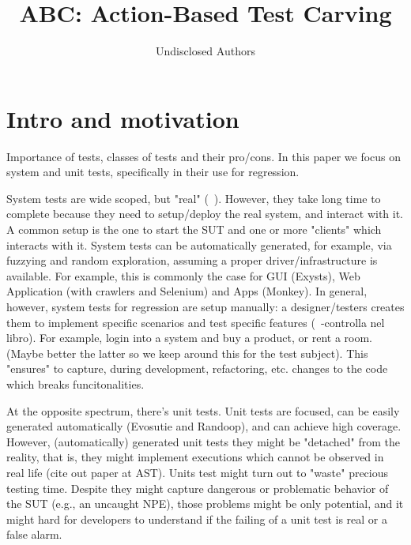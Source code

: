 \documentclass[10pt,conference]{IEEEtran}
\title{ABC: Action-Based Test Carving}
\author{Undisclosed Authors}
\author{\IEEEauthorblockN{Alessio Gambi}
\IEEEauthorblockA{\textit{University of Passau} \\
Passau, Germany \\
alessio.gambi@uni-passau.de}%
}
\begin{document}
\maketitle

\begin{abstract}
\end{abstract}

\section{Intro and motivation}
Importance of tests, classes of tests and their pro/cons.
In this paper we focus on system and unit tests, specifically in their use for regression.

System tests are wide scoped, but "real" (~\cite{exysts}).
However, they take long time to complete because they need to setup/deploy the real system, and interact with it.
A common setup is the one to start the SUT and one or more "clients" which interacts with it.
System tests can be automatically generated, for example, via fuzzying and random exploration, assuming a proper driver/infrastructure is available.
For example, this is commonly the case for GUI (Exysts),  Web Application (with crawlers and Selenium) and Apps (Monkey).
%
In general, however, system tests for regression are setup manually: a designer/testers creates them to implement 
specific scenarios and test specific features (~\cite{TDD}-controlla nel libro).
%
For example, login into a system and buy a product, or rent a room. (Maybe better the latter so we keep around this for the test subject). 
%
This "ensures" to capture, during development, refactoring, etc. changes to the code which breaks funcitonalities. 

At the opposite spectrum, there's unit tests. Unit tests are focused, can be easily generated automatically (Evosutie and Randoop), and can achieve high coverage. However, (automatically) generated unit tests they might be "detached" from the reality, that is, they might implement executions which cannot be observed in real life (cite out paper at AST). Units test might turn out to  "waste" precious testing time.
Despite they might capture dangerous or problematic behavior of the SUT (e.g., an uncaught NPE), those problems might be only potential, and it might hard for developers to understand if the failing of a unit test is real or a false alarm.
\end{document}
